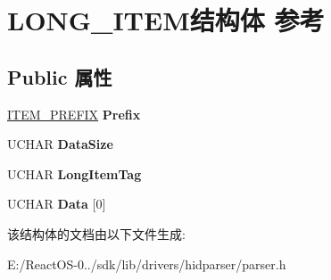 \hypertarget{struct_l_o_n_g___i_t_e_m}{}\section{L\+O\+N\+G\+\_\+\+I\+T\+E\+M结构体 参考}
\label{struct_l_o_n_g___i_t_e_m}
\subsection*{Public 属性}
\begin{DoxyCompactItemize}
\item 
\mbox{\label{struct_l_o_n_g___i_t_e_m_aeb170297b8dd52e016b9422171d0a125}} 
\hyperlink{struct_i_t_e_m___p_r_e_f_i_x}{I\+T\+E\+M\+\_\+\+P\+R\+E\+F\+IX} {\bfseries Prefix}
\item 
\mbox{\label{struct_l_o_n_g___i_t_e_m_a1f04c1db45d7dcf74fbe060b01bec590}} 
U\+C\+H\+AR {\bfseries Data\+Size}
\item 
\mbox{\label{struct_l_o_n_g___i_t_e_m_a7ed84b0a062983d58568e9acba82a491}} 
U\+C\+H\+AR {\bfseries Long\+Item\+Tag}
\item 
\mbox{\label{struct_l_o_n_g___i_t_e_m_a87c6fb35d4677c71760a23038b49d7e8}} 
U\+C\+H\+AR {\bfseries Data} \mbox{[}0\mbox{]}
\end{DoxyCompactItemize}


该结构体的文档由以下文件生成\+:\begin{DoxyCompactItemize}
\item 
E\+:/\+React\+O\+S-\/0../sdk/lib/drivers/hidparser/parser.\+h\end{DoxyCompactItemize}
